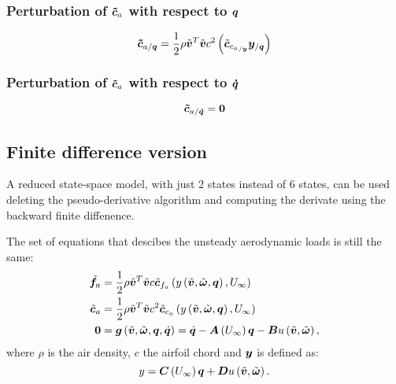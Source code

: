 \subsubsection{Perturbation of $\bm{\tilde{c}}_a$ with respect to $\bm{q}$}
\begin{equation}
\bm{\tilde{c}}_{a/\bm{q}} = 
	\frac{1}{2} \rho \tilde{\bm{v}}^T \tilde{\bm{v}} c^2
	\left(  \tilde{\bm{c}}_{{c_{a}}_{/\bm{y}}} \bm{y}_{/\bm{q}}  \right) 
\end{equation}
\subsubsection{Perturbation of $\bm{\tilde{c}}_a$ with respect to $\bm{\dot{q}}$}
\begin{equation}
\bm{\tilde{c}}_{a/\bm{\dot{q}}} = \bm{0}
\end{equation}

\subsection{Finite difference version}

A reduced state-space model, with just 2 states instead of 6 states, can be
used deleting the pseudo-derivative algorithm and computing the derivate using
the backward finite diffenence.

The set of equations that descibes the unsteady aerodynamic loads is still the same:
\begin{subequations}
\begin{align}
	\tilde{\bm{f}}_a &= 
		\frac{1}{2} \rho \tilde{\bm{v}}^T \tilde{\bm{v}} c
		\tilde{\bm{c}}_{f_{a}}
		\left(  y 
		\left(  \tilde{\bm{v}}, \tilde{\bm{\omega}}, \bm{q} \right), U_\infty \right)\\
	\tilde{\bm{c}}_a &= 
		\frac{1}{2} \rho \tilde{\bm{v}}^T \tilde{\bm{v}} c^2
		\tilde{\bm{c}}_{c_{a}} 
		\left(  y 
		\left(  \tilde{\bm{v}}, \tilde{\bm{\omega}}, \bm{q} \right), U_\infty \right)\\
	\bm{0} &=
		\bm{g}\left( \tilde{\bm{v}},\tilde{\bm{\omega}},\bm{q}, \dot{\bm{q}} \right) = 
		\dot{\bm{q}} - \bm{A}\left( U_\infty \right) \bm{q} - \bm{B}
 		u\left( \tilde{\bm{v}}, \tilde{\bm{\omega}} \right),
\end{align}
\end{subequations}
where $\rho$ is the air density, $c$ the airfoil chord and $\bm{y}$ is defined as:
\begin{equation}
	y = \bm{C}\left( U_\infty \right) \bm{q} + \bm{D} 
 		u\left( \tilde{\bm{v}}, \tilde{\bm{\omega}} \right).
\end{equation}

